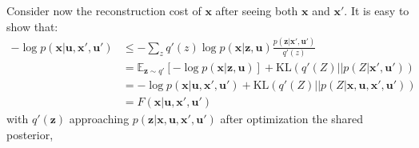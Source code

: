 \documentclass[12pt,twoside,openright]{article}
\begin{document}
Consider now the reconstruction cost of $\boldsymbol{x}$ after seeing both $\boldsymbol{x}$ and $\boldsymbol{x}'$. It is easy to show that:
\begin{align}
-\log p(\boldsymbol{x}| \boldsymbol{u}, \boldsymbol{x}', \boldsymbol{u}') 
&\leq - \sum_z q'(z) \log p(\boldsymbol{x}| \boldsymbol{z}, \boldsymbol{u}) \frac{p(\boldsymbol{z} |\boldsymbol{x}', \boldsymbol{u}')} {q'(z)}  \nonumber\\
&= \mathbb{E}_{\boldsymbol{z} \sim q'} \left[-\log p(\boldsymbol{x}| \boldsymbol{z}, \boldsymbol{u})\right] + \text{KL}(q'(Z)||p(Z|\boldsymbol{x}',\boldsymbol{u}'))
\label{eq:FEP-uxu}\\
&=  -\log p(\boldsymbol{x}| \boldsymbol{u}, \boldsymbol{x}',\boldsymbol{u}') + \text{KL}(q'(Z)||p(Z|\boldsymbol{x},\boldsymbol{u},\boldsymbol{x}',\boldsymbol{u}'))
\label{eq:FEP-uxu2}\\
&= F(\boldsymbol{x}|\boldsymbol{u}, \boldsymbol{x}', \boldsymbol{u}')\nonumber
\end{align}
with $q'(\boldsymbol{z})$ approaching  $p(\boldsymbol{z}|\boldsymbol{x}, \boldsymbol{u}, \boldsymbol{x}', \boldsymbol{u}')$ after optimization the shared posterior,
\end{document}
